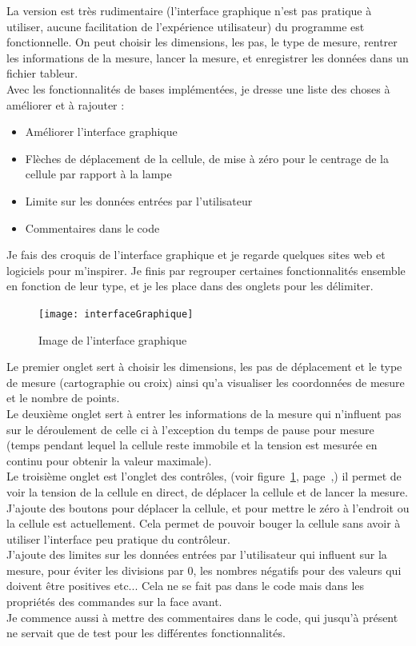 \documentclass[12pt]{article}
\begin{document}
La version est très rudimentaire (l'interface graphique n'est pas pratique à utiliser, aucune facilitation de l'expérience utilisateur) du programme est fonctionnelle.
On peut choisir les dimensions, les pas, le type de mesure, rentrer les informations de la mesure, lancer la mesure, et enregistrer les données dans un fichier tableur.\\
Avec les fonctionnalités de bases implémentées, je dresse une liste des choses à améliorer et à rajouter :
\begin{itemize}
	\item Améliorer l'interface graphique
	\item Flèches de déplacement de la cellule, de mise à zéro pour le centrage de la cellule par rapport à la lampe
	\item Limite sur les données entrées par l'utilisateur
	\item Commentaires dans le code
\end{itemize}
Je fais des croquis de l'interface graphique et je regarde quelques sites web et logiciels pour m'inspirer.
Je finis par regrouper certaines fonctionnalités ensemble en fonction de leur type, et je les place dans des onglets pour les délimiter.
\begin{figure}[H]
	\centering
	\texttt{[image: interfaceGraphique]}
	\caption{Image de l'interface graphique}
	\label{fig:interfaceGraphique}
\end{figure}
Le premier onglet sert à choisir les dimensions, les pas de déplacement et le type de mesure (cartographie ou croix) ainsi qu'a visualiser les coordonnées de mesure et le nombre de points.\\
Le deuxième onglet sert à entrer les informations de la mesure qui n'influent pas sur le déroulement de celle ci à l'exception du temps de pause pour mesure (temps pendant lequel la cellule reste immobile et la tension est mesurée en continu pour obtenir la valeur maximale).\\
Le troisième onglet est l'onglet des contrôles, (voir figure~\ref{fig:interfaceGraphique}, page~\pageref{fig:interfaceGraphique},) il permet de voir la tension de la cellule en direct, de déplacer la cellule et de lancer la mesure.
J'ajoute des boutons pour déplacer la cellule, et pour mettre le zéro à l'endroit ou la cellule est actuellement.
Cela permet de pouvoir bouger la cellule sans avoir à utiliser l'interface peu pratique du contrôleur.\\
J'ajoute des limites sur les données entrées par l'utilisateur qui influent sur la mesure, pour éviter les divisions par 0, les nombres négatifs pour des valeurs qui doivent être positives etc... Cela ne se fait pas dans le code mais dans les propriétés des commandes sur la face avant.\\
Je commence aussi à mettre des commentaires dans le code, qui jusqu'à présent ne servait que de test pour les différentes fonctionnalités.
\end{document}
